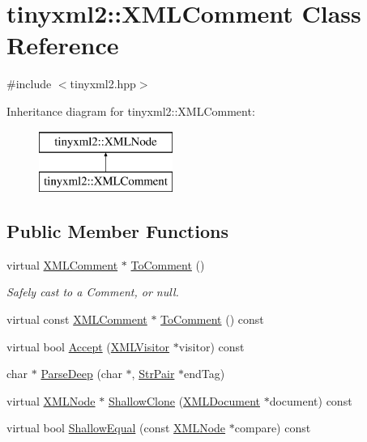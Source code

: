 \hypertarget{classtinyxml2_1_1_x_m_l_comment}{\section{tinyxml2\-:\-:X\-M\-L\-Comment Class Reference}
\label{classtinyxml2_1_1_x_m_l_comment}
}


{\ttfamily \#include $<$tinyxml2.\-hpp$>$}

Inheritance diagram for tinyxml2\-:\-:X\-M\-L\-Comment\-:\begin{figure}[H]
\begin{center}
\leavevmode
\includegraphics[height=2.000000cm]{classtinyxml2_1_1_x_m_l_comment}
\end{center}
\end{figure}
\subsection*{Public Member Functions}
\begin{DoxyCompactItemize}
\item 
virtual \hyperlink{classtinyxml2_1_1_x_m_l_comment}{X\-M\-L\-Comment} $\ast$ \hyperlink{classtinyxml2_1_1_x_m_l_comment_a8093e1dc8a34fa446d9dc3fde0e6c0ee}{To\-Comment} ()
\begin{DoxyCompactList}\small\item\em Safely cast to a Comment, or null. \end{DoxyCompactList}\item 
virtual const \hyperlink{classtinyxml2_1_1_x_m_l_comment}{X\-M\-L\-Comment} $\ast$ \hyperlink{classtinyxml2_1_1_x_m_l_comment_a422aabac22de7d9c9cad130897dd8b1c}{To\-Comment} () const 
\item 
virtual bool \hyperlink{classtinyxml2_1_1_x_m_l_comment_aa382b1be6a8b0650c16a2d88bb499335}{Accept} (\hyperlink{classtinyxml2_1_1_x_m_l_visitor}{X\-M\-L\-Visitor} $\ast$visitor) const 
\item 
char $\ast$ \hyperlink{classtinyxml2_1_1_x_m_l_comment_aa6ab35c3bb1c1840371dc32a2040c57f}{Parse\-Deep} (char $\ast$, \hyperlink{classtinyxml2_1_1_str_pair}{Str\-Pair} $\ast$end\-Tag)
\item 
virtual \hyperlink{classtinyxml2_1_1_x_m_l_node}{X\-M\-L\-Node} $\ast$ \hyperlink{classtinyxml2_1_1_x_m_l_comment_a90bb60193a691b484f5e1b487857016d}{Shallow\-Clone} (\hyperlink{classtinyxml2_1_1_x_m_l_document}{X\-M\-L\-Document} $\ast$document) const 
\item 
virtual bool \hyperlink{classtinyxml2_1_1_x_m_l_comment_a2d9f26757b0018fce933e74420cda22a}{Shallow\-Equal} (const \hyperlink{classtinyxml2_1_1_x_m_l_node}{X\-M\-L\-Node} $\ast$compare) const 
\end{DoxyCompactItemize}
